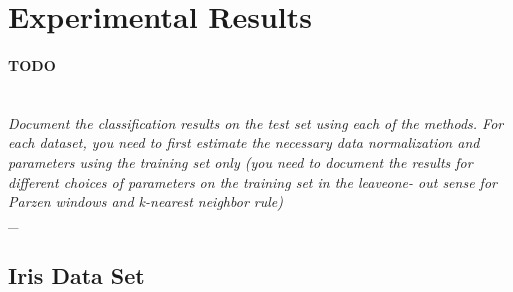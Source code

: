 \documentclass{article}
\newcommand{\outline}[2]{\paragraph{\textsc{#1}}\hrulefill~\\{\small\it #2}\\\_\hrulefill~\\}
\newcommand{\todo}[1]{\outline{\large TODO}{#1}}
\begin{document}
\section{Experimental Results}
\todo{Document the classification results on the test set using each of the methods. For each dataset, you need to first estimate the necessary data normalization and parameters using the training set only (you need to document the results for different choices of parameters on the training set in the leaveone- out sense for Parzen windows and k-nearest neighbor rule)}

\subsection{Iris Data Set}
\end{document}
